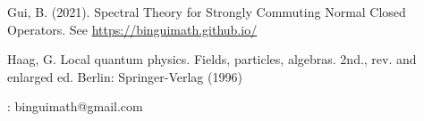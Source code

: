 \documentclass[12pt,b5paper,notitlepage]{article}
\theoremstyle{definition}
\theoremstyle{plain}
\numberwithin{equation}{section}
\begin{document}
 
\hypertarget{beforeindex}{}




\newpage

\printindex


\begin{thebibliography}{999999}
\footnotesize	



Gui, B. (2021). Spectral Theory for Strongly Commuting Normal Closed Operators. See \href{https://binguimath.github.io/}{https://binguimath.github.io/}


Haag, G. Local quantum physics. Fields, particles, algebras. 2nd., rev. and enlarged ed. Berlin: Springer-Verlag (1996)







\end{thebibliography}

: binguimath@gmail.com
\end{document}
